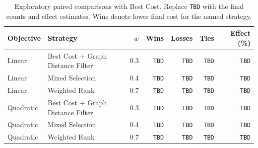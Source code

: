 \documentclass{article}
\theoremstyle{plain}
\theoremstyle{definition}
\theoremstyle{remark}
\begin{document}
\begin{table}[h!]
    \centering
    \caption{Exploratory paired comparisons with Best Cost. Replace \texttt{TBD} with the final counts and effect estimates. Wins denote lower final cost for the named strategy.}
    \label{tab:selection_strategy_screening}
    \begin{tabular}{llrrrrr}
        \toprule
        Objective & Strategy & $w$ & Wins & Losses & Ties & Effect (\%) \\
        \midrule
        Linear & Best Cost + Graph Distance Filter & 0.3 & \texttt{TBD} & \texttt{TBD} & \texttt{TBD} & \texttt{TBD} \\
        Linear & Mixed Selection & 0.4 & \texttt{TBD} & \texttt{TBD} & \texttt{TBD} & \texttt{TBD} \\
        Linear & Weighted Rank & 0.7 & \texttt{TBD} & \texttt{TBD} & \texttt{TBD} & \texttt{TBD} \\
        Quadratic & Best Cost + Graph Distance Filter & 0.3 & \texttt{TBD} & \texttt{TBD} & \texttt{TBD} & \texttt{TBD} \\
        Quadratic & Mixed Selection & 0.4 & \texttt{TBD} & \texttt{TBD} & \texttt{TBD} & \texttt{TBD} \\
        Quadratic & Weighted Rank & 0.7 & \texttt{TBD} & \texttt{TBD} & \texttt{TBD} & \texttt{TBD} \\
        \bottomrule
    \end{tabular}
\end{table}
\end{document}
